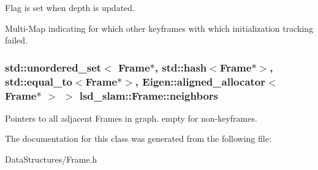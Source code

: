 Flag is set when depth is updated. 

Multi-\/\-Map indicating for which other keyframes with which initialization tracking failed. \hypertarget{classlsd__slam_1_1_frame_ac0beb1665cd6caecfef8f6103203c147}{
\subsubsection[{neighbors}]{\setlength{\rightskip}{0pt plus 5cm}std\-::unordered\-\_\-set$<$ {\bf Frame}$\ast$, std\-::hash$<${\bf Frame}$\ast$$>$, std\-::equal\-\_\-to$<${\bf Frame}$\ast$$>$, Eigen\-::aligned\-\_\-allocator$<$ {\bf Frame}$\ast$ $>$ $>$ lsd\-\_\-slam\-::\-Frame\-::neighbors}}\label{classlsd__slam_1_1_frame_ac0beb1665cd6caecfef8f6103203c147}
Pointers to all adjacent Frames in graph. empty for non-\/keyframes. 

The documentation for this class was generated from the following file\-:\begin{DoxyCompactItemize}
\item 
Data\-Structures/Frame.\-h\end{DoxyCompactItemize}
